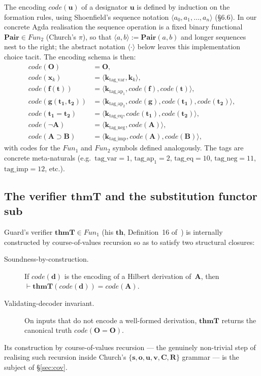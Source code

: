 \documentclass[11pt]{article}
\theoremstyle{plain}
\theoremstyle{definition}
\theoremstyle{remark}
\newcommand{\code}[1]{\mathit{code}(#1)}
\newcommand{\sub}{\mathbf{sub}}
\newcommand{\thmT}{\mathbf{thmT}}
\newcommand{\Pair}{\mathbf{Pair}}
\newcommand{\seq}[1]{\langle #1 \rangle}
\newcommand{\Fun}{\mathit{Fun}}
\begin{document}
The encoding $\code{\mathbf{u}}$ of a designator $\mathbf{u}$ is
defined by induction on the formation rules, using Shoenfield's
sequence notation $\seq{a_0, a_1, \ldots, a_n}$ ({\S}6.6).  In our
concrete Agda realisation the sequence operation is a fixed binary
functional $\Pair \in \Fun_2$ (Church's $\pi$), so that
$\seq{a, b} := \Pair(a, b)$ and longer sequences nest to the right;
the abstract notation $\seq{\cdot}$ below leaves this implementation
choice tacit.  The encoding schema is then:
\begin{align*}
\code{\mathbf{O}}              &= \mathbf{O}, \\
\code{\mathbf{x}_k}            &= \seq{\mathbf{k}_{\mathrm{tag\_var}}, \mathbf{k}_k}, \\
\code{\mathbf{f}(\mathbf{t})}  &= \seq{\mathbf{k}_{\mathrm{tag\_ap_1}}, \code{\mathbf{f}}, \code{\mathbf{t}}}, \\
\code{\mathbf{g}(\mathbf{t_1}, \mathbf{t_2})} &= \seq{\mathbf{k}_{\mathrm{tag\_ap_2}}, \code{\mathbf{g}}, \code{\mathbf{t_1}}, \code{\mathbf{t_2}}}, \\
\code{\mathbf{t_1} = \mathbf{t_2}} &= \seq{\mathbf{k}_{\mathrm{tag\_eq}}, \code{\mathbf{t_1}}, \code{\mathbf{t_2}}}, \\
\code{\neg \mathbf{A}}         &= \seq{\mathbf{k}_{\mathrm{tag\_neg}}, \code{\mathbf{A}}}, \\
\code{\mathbf{A} \supset \mathbf{B}} &= \seq{\mathbf{k}_{\mathrm{tag\_imp}}, \code{\mathbf{A}}, \code{\mathbf{B}}},
\end{align*}
with codes for the $\Fun_1$ and $\Fun_2$ symbols defined analogously.
The tags are concrete meta-naturals (e.g.\ $\mathrm{tag\_var}=1$,
$\mathrm{tag\_ap_1}=2$, $\mathrm{tag\_eq}=10$, $\mathrm{tag\_neg}=11$,
$\mathrm{tag\_imp}=12$, etc.).

\subsection{The verifier $\thmT$ and the substitution functor $\sub$}

Guard's verifier $\thmT \in \Fun_1$ (his $\mathbf{th}$, Definition~16
of~\cite{Guard1963}) is internally constructed by course-of-values
recursion so as to satisfy two structural closures:
\begin{description}
\item[Soundness-by-construction.] If $\code{\mathbf{d}}$ is the
encoding of a Hilbert derivation of~$\mathbf{A}$, then
$\vdash \thmT(\code{\mathbf{d}}) = \code{\mathbf{A}}$.

\item[Validating-decoder invariant.] On inputs that do not
encode a well-formed derivation, $\thmT$ returns the canonical truth
$\code{\mathbf{O} = \mathbf{O}}$.
\end{description}
Its construction by course-of-values recursion --- the genuinely
non-trivial step of realising such recursion inside Church's
$\{\mathbf{s},\mathbf{o},\mathbf{u},\mathbf{v},\mathbf{C},\mathbf{R}\}$
grammar --- is the subject of {\S}\ref{sec:cov}.
\end{document}
